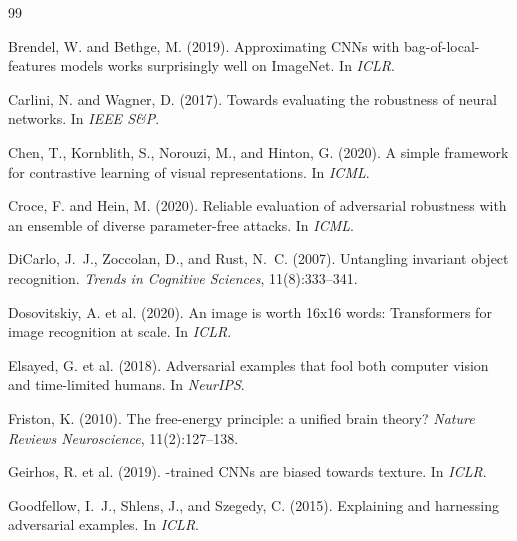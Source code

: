 \documentclass[12pt,a4paper]{article}
\begin{document}

\begin{thebibliography}{99}

Brendel, W. and Bethge, M. (2019).
\newblock Approximating {CNNs} with bag-of-local-features models works
  surprisingly well on {ImageNet}.
\newblock In \emph{ICLR}.

Carlini, N. and Wagner, D. (2017).
\newblock Towards evaluating the robustness of neural networks.
\newblock In \emph{IEEE S\&P}.

Chen, T., Kornblith, S., Norouzi, M., and Hinton, G. (2020).
\newblock A simple framework for contrastive learning of visual representations.
\newblock In \emph{ICML}.

Croce, F. and Hein, M. (2020).
\newblock Reliable evaluation of adversarial robustness with an ensemble
  of diverse parameter-free attacks.
\newblock In \emph{ICML}.

DiCarlo, J.~J., Zoccolan, D., and Rust, N.~C. (2007).
\newblock Untangling invariant object recognition.
\newblock \emph{Trends in Cognitive Sciences}, 11(8):333--341.

Dosovitskiy, A. et al. (2020).
\newblock An image is worth 16x16 words: Transformers for image recognition
  at scale.
\newblock In \emph{ICLR}.

Elsayed, G. et al. (2018).
\newblock Adversarial examples that fool both computer vision and
  time-limited humans.
\newblock In \emph{NeurIPS}.

Friston, K. (2010).
\newblock The free-energy principle: a unified brain theory?
\newblock \emph{Nature Reviews Neuroscience}, 11(2):127--138.

Geirhos, R. et al. (2019).
-trained {CNNs} are biased towards texture.
\newblock In \emph{ICLR}.

Goodfellow, I.~J., Shlens, J., and Szegedy, C. (2015).
\newblock Explaining and harnessing adversarial examples.
\newblock In \emph{ICLR}.


\end{thebibliography}
\end{document}
